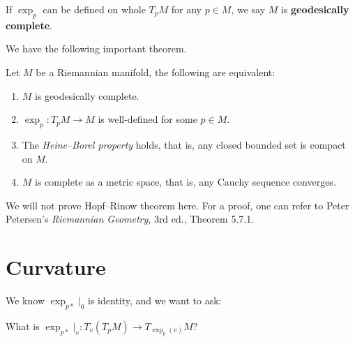 \begin{defn}\label{geodesically completeness}
    If $\exp_p$ can be defined on whole $T_pM$ for any $p\in M$, we say $M$ is \textbf{geodesically complete}.
\end{defn}

We have the following important theorem.

\begin{thm}
    Let $M$ be a Riemannian manifold, the following are equivalent:
    \begin{enumerate}[(1)]
        \item $M$ is geodesically complete.
        \item $\exp_p:T_pM\to M$ is well-defined for some $p\in M$.
        \item The \emph{Heine--Borel property} holds, that is, any closed bounded set is compact on $M$.
        \item $M$ is complete as a metric space, that is, any Cauchy sequence converges.
    \end{enumerate}
\end{thm}

We will not prove Hopf--Rinow theorem here.
For a proof, one can refer to Peter Petersen's \emph{Riemannian Geometry}, 3rd ed., Theorem 5.7.1.

\section{Curvature}\label{sect of curv}

We know $\exp_{p*}|_0$ is identity, and we want to ask:
\begin{ques}
    What is $\exp_{p*}|_v:T_v(T_pM)\to T_{\exp_{p}(v)}M$?
\end{ques}

